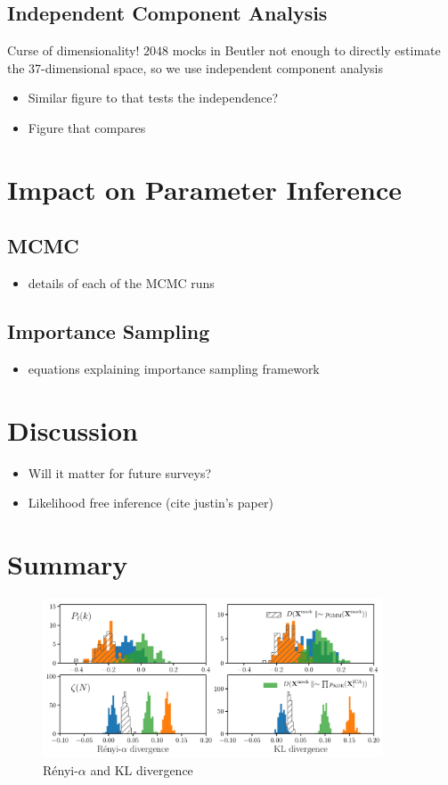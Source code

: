 \documentclass[12pt, letterpaper, preprint]{aastex}
\newcommand{\bitem}{\begin{itemize}}
\newcommand{\eitem}{\end{itemize}}
\begin{document}
\subsection{Independent Component Analysis} 
Curse of dimensionality! $2048$ mocks in Beutler not enough to directly estimate 
the 37-dimensional space, so we use independent component analysis 
\cite{hartlap2009}
\bitem
    \item Similar figure to \cite{hartlap2009} that tests the independence? 
    \item Figure that compares 
\eitem

\section{Impact on Parameter Inference}
\subsection{MCMC}
\bitem
    \item details of each of the MCMC runs
\eitem

\subsection{Importance Sampling} 
\bitem
    \item equations explaining importance sampling framework
\eitem

\section{Discussion}
\bitem
    \item Will it matter for future surveys? 
    \item Likelihood free inference (cite justin's paper) 
\eitem

\section{Summary}

\begin{figure}
\begin{center}
\includegraphics[width=0.9\textwidth]{figs/kNNdiverg_nonGauss.pdf}
\caption{R\'enyi-$\alpha$ and KL divergence}
\label{fig:div_nongauss}
\end{center}
\end{figure}
\end{document}
